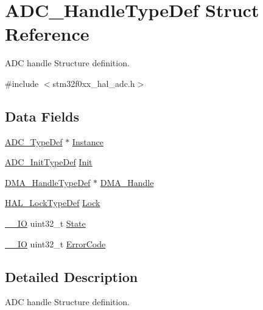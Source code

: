\hypertarget{struct_a_d_c___handle_type_def}{}\section{A\+D\+C\+\_\+\+Handle\+Type\+Def Struct Reference}
\label{struct_a_d_c___handle_type_def}


A\+DC handle Structure definition.  




{\ttfamily \#include $<$stm32f0xx\+\_\+hal\+\_\+adc.\+h$>$}

\subsection*{Data Fields}
\begin{DoxyCompactItemize}
\item 
\hyperlink{struct_a_d_c___type_def}{A\+D\+C\+\_\+\+Type\+Def} $\ast$ \hyperlink{struct_a_d_c___handle_type_def_abfce5509f2d1f9d3ef9012b7b7b528fa}{Instance}
\item 
\hyperlink{struct_a_d_c___init_type_def}{A\+D\+C\+\_\+\+Init\+Type\+Def} \hyperlink{struct_a_d_c___handle_type_def_a95dcd2e98a4cfc17b0939e9ca985113a}{Init}
\item 
\hyperlink{group___d_m_a___exported___types_ga92b907d56a9c29b93d46782a7a04f91e}{D\+M\+A\+\_\+\+Handle\+Type\+Def} $\ast$ \hyperlink{struct_a_d_c___handle_type_def_a26dce701f4dd78176b421b5d6ddee0ba}{D\+M\+A\+\_\+\+Handle}
\item 
\hyperlink{stm32f0xx__hal__def_8h_ab367482e943333a1299294eadaad284b}{H\+A\+L\+\_\+\+Lock\+Type\+Def} \hyperlink{struct_a_d_c___handle_type_def_ad4cf225029dbefe8d3fe660c33b8bb6b}{Lock}
\item 
\hyperlink{core__sc300_8h_aec43007d9998a0a0e01faede4133d6be}{\+\_\+\+\_\+\+IO} uint32\+\_\+t \hyperlink{struct_a_d_c___handle_type_def_ae822ffccdec1899d5cfcbab448119810}{State}
\item 
\hyperlink{core__sc300_8h_aec43007d9998a0a0e01faede4133d6be}{\+\_\+\+\_\+\+IO} uint32\+\_\+t \hyperlink{struct_a_d_c___handle_type_def_a123c5063e6a3b1901b2fbe5f88c53a7e}{Error\+Code}
\end{DoxyCompactItemize}


\subsection{Detailed Description}
A\+DC handle Structure definition. 

